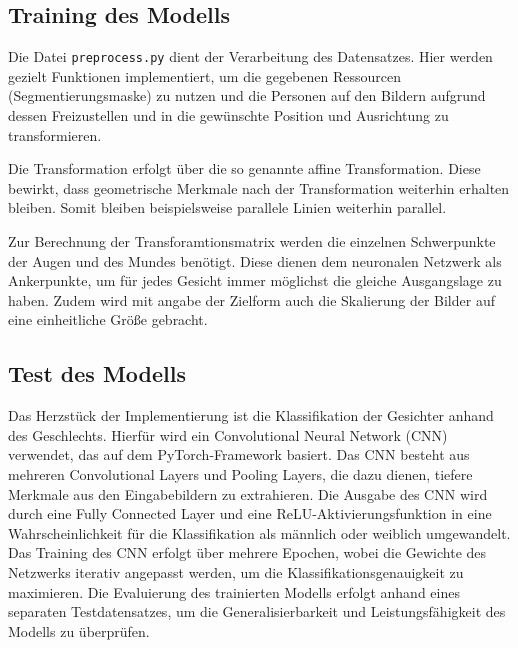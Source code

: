 \documentclass[journal,twoside,web]{ieeecolor}
\begin{document}
\subsection{Training des Modells}

Die Datei \texttt{preprocess.py} dient der Verarbeitung des Datensatzes. Hier werden gezielt Funktionen implementiert, um die gegebenen Ressourcen (Segmentierungsmaske) zu nutzen und die Personen auf den Bildern aufgrund dessen Freizustellen und in die gewünschte Position und Ausrichtung zu transformieren. 

Die Transformation erfolgt über die so genannte affine Transformation. Diese bewirkt, dass geometrische Merkmale nach der Transformation weiterhin erhalten bleiben. Somit bleiben beispielsweise parallele Linien weiterhin parallel.

Zur Berechnung der Transforamtionsmatrix werden die einzelnen Schwerpunkte der Augen und des Mundes benötigt. Diese dienen dem neuronalen Netzwerk als Ankerpunkte, um für jedes Gesicht immer möglichst die gleiche Ausgangslage zu haben. Zudem wird mit angabe der Zielform auch die Skalierung der Bilder auf eine einheitliche Größe gebracht.

\subsection{Test des Modells}
Das Herzstück der Implementierung ist die Klassifikation der Gesichter anhand des Geschlechts. Hierfür wird ein Convolutional Neural Network (CNN) verwendet, das auf dem PyTorch-Framework basiert. Das CNN besteht aus mehreren Convolutional Layers und Pooling Layers, die dazu dienen, tiefere Merkmale aus den Eingabebildern zu extrahieren. Die Ausgabe des CNN wird durch eine Fully Connected Layer und eine ReLU-Aktivierungsfunktion in eine Wahrscheinlichkeit für die Klassifikation als männlich oder weiblich umgewandelt. Das Training des CNN erfolgt über mehrere Epochen, wobei die Gewichte des Netzwerks iterativ angepasst werden, um die Klassifikationsgenauigkeit zu maximieren. Die Evaluierung des trainierten Modells erfolgt anhand eines separaten Testdatensatzes, um die Generalisierbarkeit und Leistungsfähigkeit des Modells zu überprüfen.

\end{document}
